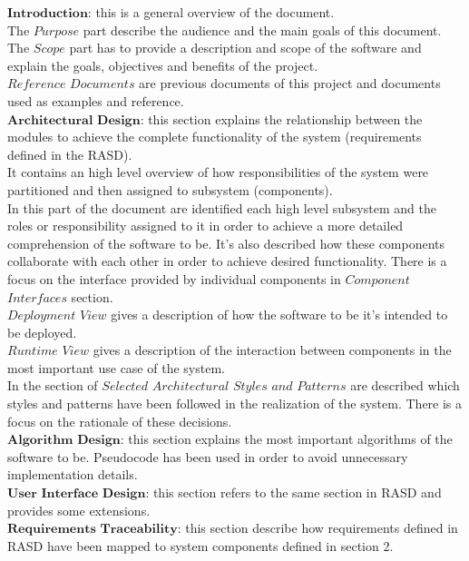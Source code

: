 $\mathbf{Introduction}$: this is a general overview of the document.\\
The $\mathit{Purpose}$ part describe the audience and the main goals
of this document.\\
The $\mathit{Scope}$ part has to provide a description and scope
of the software and explain the goals, objectives and benefits of
the project.\\
$\mathit{Reference}$ $\mathit{Documents}$ are previous documents
of this project and documents used as examples and reference.\\
$\mathbf{\mathbf{Architectural}}$ $\mathbf{Design}$: this section
explains the relationship between the modules to achieve the complete
functionality of the system (requirements defined in the RASD).\\
It contains an high level overview of how responsibilities of the
system were partitioned and then assigned to subsystem (components).
\\
In this part of the document are identified each high level subsystem
and the roles or responsibility assigned to it in order to achieve
a more detailed comprehension of the software to be. It's also described
how these components collaborate with each other in order to achieve
desired functionality. There is a focus on the interface provided
by individual components in $\mathit{Component}$ $\mathit{Interfaces}$
section.\\
$\mathit{Deployment}$ $\mathit{View}$ gives a description of how
the software to be it's intended to be deployed.\\
$\mathit{Runtime}$ $\mathit{View}$ gives a description of the interaction
between components in the most important use case of the system.\\
In the section of $\mathit{Selected}$ $\mathit{Architectural}$ $\mathit{Styles}$
$\mathit{and}$ $\mathit{Patterns}$ are described which styles and
patterns have been followed in the realization of the system. There
is a focus on the rationale of these decisions.\\
$\mathbf{Algorithm}$ $\mathbf{Design}$: this section explains the
most important algorithms of the software to be. Pseudo\textendash code
has been used in order to avoid unnecessary implementation details.
\\
$\mathbf{User}$ $\mathbf{Interface}$ $\mathbf{Design}$: this section
refers to the same section in RASD and provides some extensions.\\
$\mathbf{Requirements}$ $\mathbf{Traceability}$: this section describe
how requirements defined in RASD have been mapped to system components
defined in section 2. \\

